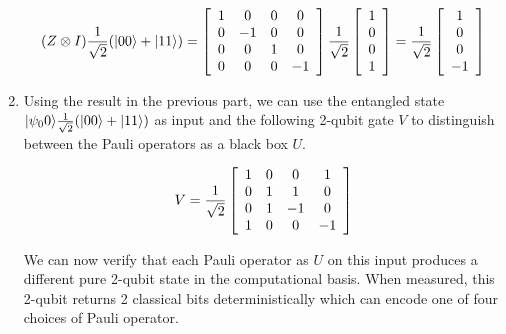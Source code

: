 \documentclass[12pt]{article}
\begin{document}
\begin{enumerate}
\begin{displaymath}
(Z \otimes I) \frac{1}{\sqrt{2}}(|00 \rangle + |11 \rangle) =
\left[ \begin{array}{cccc}
1 & 0 & 0 & 0 \\
0 & -1 & 0 & 0 \\
0 & 0 & 1 & 0 \\
0 & 0 & 0 & -1
\end{array} \right]
\frac{1}{\sqrt{2}}
\left[ \begin{array}{c}
1\\
0\\
0\\
1
\end{array} \right] =
\frac{1}{\sqrt{2}}
\left[ \begin{array}{c}
1\\
0\\
0\\
-1
\end{array} \right]
\end{displaymath}

\item %
Using the result in the previous part, we can use the entangled state
$|\psi_00 \rangle\frac{1}{\sqrt{2}}(|00 \rangle + |11 \rangle)$ as input and the following 2-qubit gate
$V$ to distinguish between the Pauli operators as a black box $U$.

\begin{displaymath}
V = \frac{1}{\sqrt{2}} \left[ \begin{array}{cccc}
1 & 0 & 0 & 1 \\
0 & 1 & 1 & 0 \\
0 & 1 & -1 & 0 \\
1 & 0 & 0 & -1
\end{array} \right]
\end{displaymath}

We can now verify that each Pauli operator as $U$ on this input produces
a different pure 2-qubit state in the computational basis. When measured,
this 2-qubit returns 2 classical bits deterministically
which can encode one of four choices of Pauli operator.


\end{enumerate}
\end{document}

